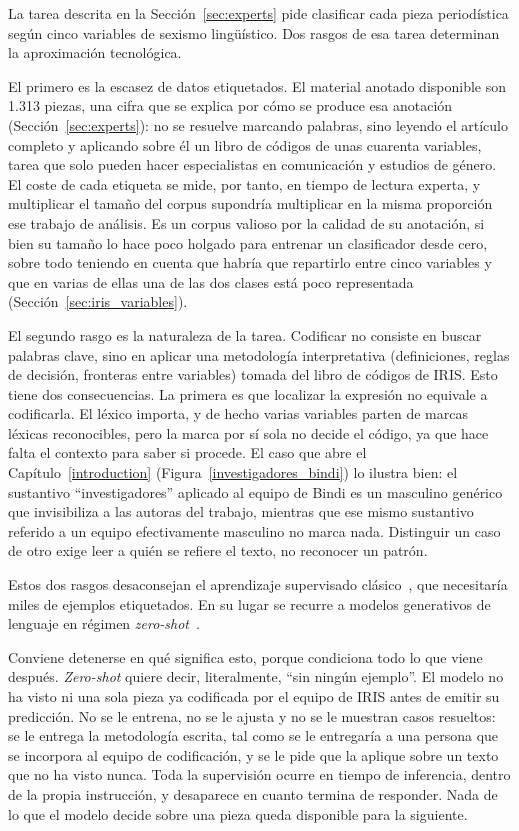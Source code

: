 
La tarea descrita en la Sección~\ref{sec:experts} pide clasificar cada pieza
periodística según cinco variables de sexismo lingüístico. Dos rasgos de esa
tarea determinan la aproximación tecnológica.

El primero es la escasez de datos etiquetados. El material anotado disponible son 1.313
piezas, una cifra que se explica por cómo se produce esa anotación
(Sección~\ref{sec:experts}): no se resuelve marcando palabras, sino leyendo el
artículo completo y aplicando sobre él un libro de códigos de unas cuarenta
variables, tarea que solo pueden hacer especialistas en comunicación y estudios
de género. El coste de cada etiqueta se mide, por tanto, en tiempo de lectura
experta, y multiplicar el tamaño del corpus supondría multiplicar en la misma
proporción ese trabajo de análisis. Es un corpus valioso por la calidad de su
anotación, si bien su tamaño lo hace poco holgado para entrenar un clasificador
desde cero, sobre todo teniendo en cuenta que habría que repartirlo entre cinco
variables y que en varias de ellas una de las dos clases está poco
representada (Sección~\ref{sec:iris_variables}).

El segundo rasgo es la naturaleza de la tarea. Codificar no consiste en buscar
palabras clave, sino en aplicar una metodología interpretativa (definiciones, reglas de decisión,
fronteras entre variables) tomada del libro de códigos de IRIS. Esto tiene dos
consecuencias. La primera es que localizar la expresión no equivale a codificarla.
El léxico importa, y de hecho varias variables parten de marcas léxicas
reconocibles, pero la marca por sí sola no decide el código, ya que hace falta el
contexto para saber si procede. El caso que abre el Capítulo~\ref{introduction}
(Figura~\ref{investigadores_bindi}) lo ilustra bien: el sustantivo ``investigadores'' aplicado al equipo de Bindi es un
masculino genérico que invisibiliza a las autoras del trabajo, mientras que ese
mismo sustantivo referido a un equipo efectivamente masculino no marca nada. Distinguir un caso de otro exige leer a quién
se refiere el texto, no reconocer un patrón.


Estos dos rasgos desaconsejan el aprendizaje supervisado clásico~\cite{lecun2015deep},
que necesitaría miles de ejemplos etiquetados. En su lugar se recurre a modelos
generativos de lenguaje en régimen \textit{zero-shot}~\cite{radford2019, brown2020}.


Conviene detenerse en qué significa esto, porque condiciona todo lo que viene
después. \textit{Zero-shot} quiere decir, literalmente, ``sin ningún ejemplo''.
El modelo no ha visto ni una sola pieza ya codificada por el equipo de IRIS antes
de emitir su predicción. No se le entrena, no se le ajusta y no se le muestran
casos resueltos: se le entrega la metodología escrita, tal como se le entregaría
a una persona que se incorpora al equipo de codificación, y se le pide que la
aplique sobre un texto que no ha visto nunca. Toda la supervisión ocurre en
tiempo de inferencia, dentro de la propia instrucción, y desaparece en cuanto
termina de responder. Nada de lo que el modelo decide sobre una pieza queda
disponible para la siguiente.

